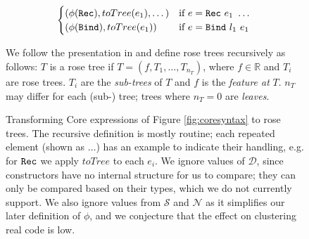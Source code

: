 \begin{figure}
\begin{align*}
\begin{cases}
      (\phi(\texttt{Rec}),     toTree(e_1), \dots)                         & \text{if $e = \texttt{Rec}\ e_1\ \dots$} \\
      (\phi(\texttt{Bind}),    toTree(e_1))                                & \text{if $e = \texttt{Bind}\ l_1\ e_1$}
    \end{cases}
  \end{align*}
  \caption{Transforming Core expressions of Figure \ref{fig:coresyntax} to rose trees. The recursive definition is mostly routine; each repeated element (shown as $\dots$) has an example to indicate their handling, e.g. for $\texttt{Rec}$ we apply $toTree$ to each $e_i$. We ignore values of $\mathcal{D}$, since constructors have no internal structure for us to compare; they can only be compared based on their types, which we do not currently support. We also ignore values from $\mathcal{S}$ and $\mathcal{N}$ as it simplifies our later definition of $\phi$, and we conjecture that the effect on clustering real code is low.}
  \label{fig:totree}
We follow the presentation in \cite{blundell2012bayesian} and define rose trees recursively as follows: $T$ is a rose tree if $T = (f, T_1, \dots, T_{n_T})$, where $f \in \mathbb{R}$ and $T_i$ are rose trees. $T_i$ are the \emph{sub-trees} of $T$ and $f$ is the \emph{feature at} $T$. $n_T$ may differ for each (sub-) tree; trees where $n_T = 0$ are \emph{leaves}.
\end{figure}

\fi
